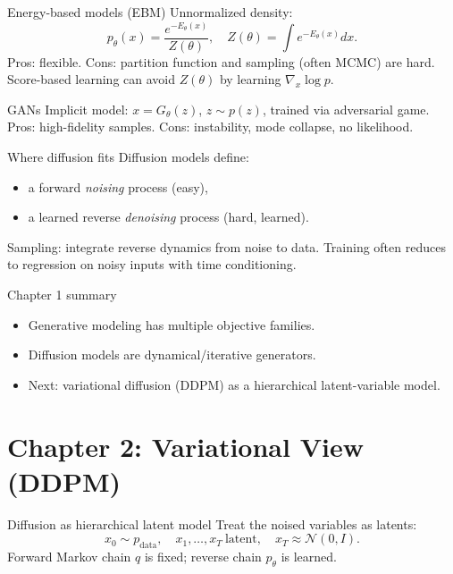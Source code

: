 \documentclass[aspectratio=169]{beamer}
\begin{document}
\begin{frame}{Energy-based models (EBM)}
Unnormalized density:
\[
p_\theta(x)=\frac{e^{-E_\theta(x)}}{Z(\theta)},\quad Z(\theta)=\int e^{-E_\theta(x)}dx.
\]
Pros: flexible.
Cons: partition function and sampling (often MCMC) are hard.
Score-based learning can avoid \(Z(\theta)\) by learning \(\nabla_x\log p\).
\end{frame}

\begin{frame}{GANs}
Implicit model: \(x=G_\theta(z)\), \(z\sim p(z)\), trained via adversarial game.
Pros: high-fidelity samples.
Cons: instability, mode collapse, no likelihood.
\end{frame}

\begin{frame}{Where diffusion fits}
Diffusion models define:
\begin{itemize}
\item a forward \emph{noising} process (easy),
\item a learned reverse \emph{denoising} process (hard, learned).
\end{itemize}
Sampling: integrate reverse dynamics from noise to data.
Training often reduces to regression on noisy inputs with time conditioning.
\end{frame}

\begin{frame}{Chapter 1 summary}
\begin{itemize}
\item Generative modeling has multiple objective families.
\item Diffusion models are dynamical/iterative generators.
\item Next: variational diffusion (DDPM) as a hierarchical latent-variable model.
\end{itemize}
\end{frame}

\section{Chapter 2: Variational View (DDPM)}

\begin{frame}{Diffusion as hierarchical latent model}
Treat the noised variables as latents:
\[
x_0 \sim p_{\text{data}},\quad x_1,\dots,x_T\ \text{latent},\quad x_T\approx \mathcal{N}(0,I).
\]
Forward Markov chain \(q\) is fixed; reverse chain \(p_\theta\) is learned.
\end{frame}
\end{document}
